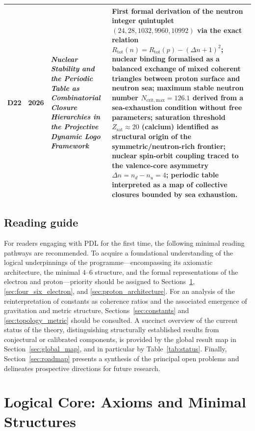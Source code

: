\documentclass[11pt,a4paper]{article}
\begin{document}
\begin{longtable}{@{}llL{4cm}p{9.0cm}@{}}
D22 & 2026 & \textit{Nuclear Stability and the Periodic Table as Combinatorial Closure Hierarchies in the Projective Dynamic Logo
Framework} &
First formal derivation of the neutron integer quintuplet $(24,28,1032,9960,10992)$ via the exact relation $R_{\mathrm{tot}}(n) = R_{\mathrm{tot}}(p) - (\Delta n+1)^2$; nuclear binding formalised as a balanced exchange of mixed coherent triangles between proton surface and neutron sea; maximum stable neutron number $N_{\mathrm{crit,max}} = 126.1$ derived from a sea-exhaustion condition without free parameters; saturation threshold $Z_{\mathrm{sat}} \approx 20$ (calcium) identified as structural origin of the symmetric/neutron-rich frontier; nuclear spin-orbit coupling traced to the valence-core asymmetry $\Delta n = n_d - n_u = 4$; periodic table interpreted as a map of collective closures bounded by sea exhaustion.
\citep{Nuclear_Stability_PDL_2026} \\[0.4em]

\bottomrule
\end{longtable}

\subsection*{Reading guide}

For readers engaging with PDL for the first time, the following minimal reading pathways are recommended. To acquire a foundational understanding of the logical underpinnings of the programme—encompassing its axiomatic architecture, the minimal $4$–$6$ structure, and the formal representations of the electron and proton—priority should be assigned to Sections~\ref{sec:logical_core}, \ref{sec:four_six_electron}, and \ref{sec:proton_architecture}. For an analysis of the reinterpretation of constants as coherence ratios and the associated emergence of gravitation and metric structure, Sections~\ref{sec:constants} and \ref{sec:topology_metric} should be consulted. A succinct overview of the current status of the theory, distinguishing structurally established results from conjectural or calibrated components, is provided by the global result map in Section~\ref{sec:global_map}, and in particular by Table~\ref{tab:status}. Finally, Section~\ref{sec:roadmap} presents a synthesis of the principal open problems and delineates prospective directions for future research.

\section{Logical Core: Axioms and Minimal Structures}
\label{sec:logical_core}
\end{document}
